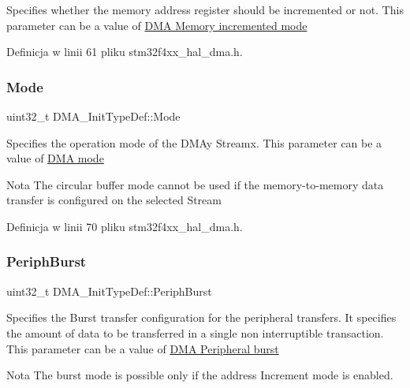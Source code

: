 Specifies whether the memory address register should be incremented or not. This parameter can be a value of \hyperlink{group___d_m_a___memory__incremented__mode}{D\+MA Memory incremented mode} 

Definicja w linii 61 pliku stm32f4xx\+\_\+hal\+\_\+dma.\+h.

\mbox{\label{struct_d_m_a___init_type_def_adbbca090b53d32ac93cc7359b7994db2}} 
\subsubsection{\texorpdfstring{Mode}{Mode}}
{\footnotesize\ttfamily uint32\+\_\+t D\+M\+A\+\_\+\+Init\+Type\+Def\+::\+Mode}

Specifies the operation mode of the D\+M\+Ay Streamx. This parameter can be a value of \hyperlink{group___d_m_a__mode}{D\+MA mode} \begin{DoxyNote}{Nota}
The circular buffer mode cannot be used if the memory-\/to-\/memory data transfer is configured on the selected Stream 
\end{DoxyNote}


Definicja w linii 70 pliku stm32f4xx\+\_\+hal\+\_\+dma.\+h.

\mbox{\label{struct_d_m_a___init_type_def_a3fbfe4dd664e24845dc75f5c8f43b5a3}} 
\subsubsection{\texorpdfstring{Periph\+Burst}{PeriphBurst}}
{\footnotesize\ttfamily uint32\+\_\+t D\+M\+A\+\_\+\+Init\+Type\+Def\+::\+Periph\+Burst}

Specifies the Burst transfer configuration for the peripheral transfers. It specifies the amount of data to be transferred in a single non interruptible transaction. This parameter can be a value of \hyperlink{group___d_m_a___peripheral__burst}{D\+MA Peripheral burst} \begin{DoxyNote}{Nota}
The burst mode is possible only if the address Increment mode is enabled. 
\end{DoxyNote}



